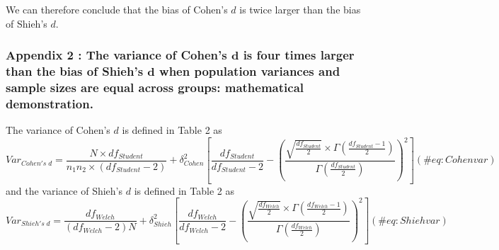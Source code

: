 \documentclass[
]{article}
\begin{document}
We can therefore conclude that the bias of Cohen's \(d\) is twice larger
than the bias of Shieh's \(d\).

\newpage

\hypertarget{appendix-2-the-variance-of-cohens-bmd-is-four-times-larger-than-the-bias-of-shiehs-bmd-when-population-variances-and-sample-sizes-are-equal-across-groups-mathematical-demonstration.}{%
\subsubsection{\texorpdfstring{Appendix 2 : The variance of Cohen's
\(\bm{d}\) is four times larger than the bias of Shieh's \(\bm{d}\) when
population variances and sample sizes are equal across groups:
mathematical
demonstration.}{Appendix 2 : The variance of Cohen's \textbackslash bm\{d\} is four times larger than the bias of Shieh's \textbackslash bm\{d\} when population variances and sample sizes are equal across groups: mathematical demonstration.}}\label{appendix-2-the-variance-of-cohens-bmd-is-four-times-larger-than-the-bias-of-shiehs-bmd-when-population-variances-and-sample-sizes-are-equal-across-groups-mathematical-demonstration.}}

The variance of Cohen's \(d\) is defined in Table 2 as \begin{equation}
Var_{Cohen's \; d}=\frac{N\times df_{Student}}{n_1n_2 \times (df_{Student}-2)} + \delta^2_{Cohen} \left[ \frac{df_{Student}}{df_{Student}-2} - \left( \frac{\sqrt{\frac{df_{Student}}{2}} \times \Gamma{\left(\frac{df_{Student}-1}{2}\right)}}{\Gamma{\left( \frac{df_{Student}}{2}\right)}} \right)^2\right]
(\#eq:Cohenvar)
\end{equation} and the variance of Shieh's \(d\) is defined in Table 2
as \begin{equation}
Var_{Shieh's \; d}=\frac{df_{Welch}}{(df_{Welch}-2)N}  + \delta^2_{Shieh} \left[ \frac{df_{Welch}}{df_{Welch}-2} - \left( \frac{\sqrt{\frac{df_{Welch}}{2}} \times \Gamma{\left(\frac{df_{Welch}-1}{2}\right)}}{\Gamma{\left( \frac{df_{Welch}}{2}\right)}} \right)^2 \right]
(\#eq:Shiehvar)
\end{equation}
\end{document}
